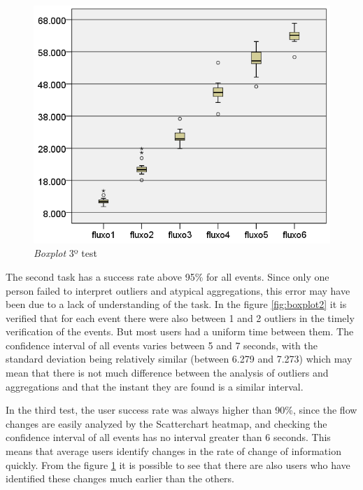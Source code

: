 \documentclass[letterpaper, 10 pt, conference]{ieeeconf}  %
\begin{document}
\begin{figure}[ht]
\begin{minipage}[b]{0.32\textwidth}
    \end{minipage}
    \hfill
    \begin{minipage}[b]{0.32\textwidth}
        \centering
        \includegraphics[width=\textwidth]{Figures/boxplot3_large.png}
        \caption{\textit{Boxplot} 3º test}
            \label{fig:boxplot3}
    \end{minipage}
    
\end{figure}

The second task has a success rate above 95\% for all events. Since only one person failed to interpret outliers and atypical aggregations, this error may have been due to a lack of understanding of the task. In the figure \ref{fig:boxplot2} it is verified that for each event there were also between 1 and 2 outliers in the timely verification of the events. But most users had a uniform time between them. The confidence interval of all events varies between 5 and 7 seconds, with the standard deviation being relatively similar (between 6.279 and 7.273) which may mean that there is not much difference between the analysis of outliers and aggregations and that the instant they are found is a similar interval.

In the third test, the user success rate was always higher than 90\%, since the flow changes are easily analyzed by the Scatterchart heatmap, and checking the confidence interval of all events has no interval greater than 6 seconds. This means that average users identify changes in the rate of change of information quickly. From the figure \ref{fig:boxplot3} it is possible to see that there are also users who have identified these changes much earlier than the others.
\end{document}
